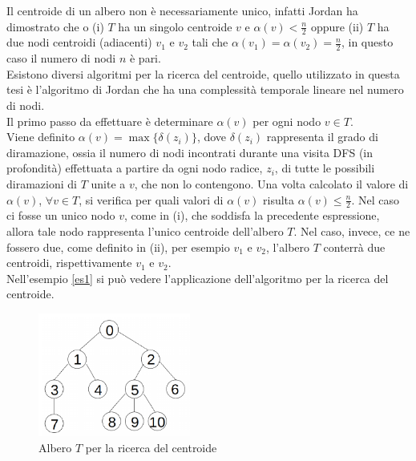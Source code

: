 Il centroide di un albero non \`e necessariamente unico, infatti Jordan \cite{jordan1869assemblages}  ha dimostrato che o (i) $ T $ ha un singolo centroide $ v $ e $\alpha(v) < \frac{n}{2}$ oppure (ii) $ T $ ha due nodi centroidi (adiacenti) $v_1$ e $v_2$ tali che $\alpha(v_1) = \alpha(v_2) = \frac{n}{2}$, in questo caso il numero di nodi $ n $ \`e pari.\\
Esistono diversi algoritmi per la ricerca del centroide, quello utilizzato in questa tesi \`e l'algoritmo di Jordan \cite{jordan1869assemblages} che  ha una complessit\`a temporale lineare nel numero di nodi. \\
Il primo passo da effettuare \`e determinare $\alpha(v)$ per ogni nodo $ v \in T$.\\
Viene definito $ \alpha(v) = \max\{\delta(z_i)\} $, dove $ \delta(z_i )$ rappresenta il grado di diramazione, ossia il numero di nodi incontrati durante una visita DFS (in profondit\`a) effettuata a partire da ogni nodo radice, $ z_i $, di tutte le possibili diramazioni di $ T $ unite a $ v $, che non lo contengono.
Una volta calcolato il valore di $ \alpha(v) $, $ \forall v \in T $, si verifica per quali valori di $ \alpha(v) $ risulta $\alpha(v)\le\frac{n}{2}$.
Nel caso ci fosse un unico nodo $ v $, come in (i), che soddisfa la precedente espressione, allora tale nodo rappresenta l'unico  centroide dell'albero $ T $.
Nel caso, invece, ce ne fossero due, come definito in (ii), per esempio $ v_1 $ e $ v_2 $,  l'albero $ T $ conterr\`a due centroidi, rispettivamente $ v_1 $ e $ v_2 $.\\
Nell'esempio \ref{es1} si pu\`o vedere l'applicazione dell'algoritmo per la ricerca del centroide.
	\begin{figure}[htbp]
		\centering
		\includegraphics[width=5cm]{capitolo3/grafo2}
		\caption{Albero $ T $  per la ricerca del centroide} 
		\label{fig:2}
\end{figure}
\mbox{}\\

